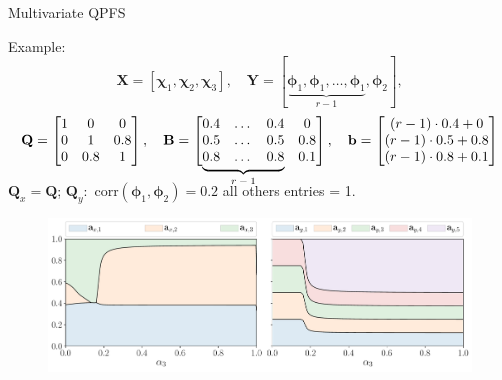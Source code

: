\documentclass[9pt]{beamer}
\newcommand{\bb}{\mathbf{b}}
\newcommand{\bY}{\mathbf{Y}}
\newcommand{\bX}{\mathbf{X}}
\newcommand{\bB}{\mathbf{B}}
\newcommand{\bQ}{\mathbf{Q}}
\newcommand{\bchi}{\boldsymbol{\chi}}
\newcommand{\bphi}{\boldsymbol{\phi}}
\newcommand\undermat[2]{%
	\makebox[0pt][l]{$\smash{\underbrace{\phantom{%
					\begin{matrix}#2\end{matrix}}}_{\text{$#1$}}}$}#2}
\begin{document}
\begin{frame}{Multivariate QPFS}
	\begin{block}{Example:}
		\vspace{-0.5cm}
		\[
		\bX = [\bchi_1, \bchi_2, \bchi_3], \quad \bY = [\underbrace{\bphi_1, \bphi_1, \dots, \bphi_1}_{r-1}, \bphi_2],
		\]
		\vspace{-0.2cm}
		\[
		\bQ = \begin{bmatrix} 1 & 0 & 0\\ 0 & 1 & 0.8 \\ 0 & 0.8 & 1 \end{bmatrix}, \quad 
		\bB = \begin{bmatrix} 0.4 & \dots & 0.4 & 0 \\ 0.5 & \dots & 0.5 & 0.8 \\ \undermat{r-1}{0.8 & \dots & 0.8} & 0.1 \end{bmatrix}, \quad
		\bb = \begin{bmatrix} (r-1) \cdot 0.4 + 0 \\ (r-1) \cdot 0.5 + 0.8 \\ (r-1) \cdot 0.8 + 0.1 \end{bmatrix}
		\]
	\end{block}
	\vspace{0.2cm}
	\begin{center}
$\bQ_x = \bQ$; $\bQ_y:$ $\text{corr}(\bphi_1, \bphi_2) = 0.2$ all others entries = 1. 
\end{center}
\begin{figure}
	\centering
	\includegraphics[width=\linewidth]{figs/features_vs_alpha.pdf}
\end{figure}
\end{frame}
\end{document}
